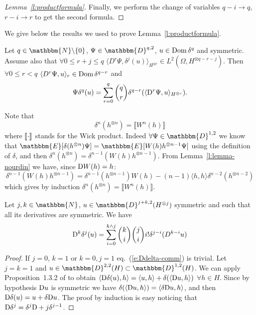 \begin{appendices}
\begin{proof}[Lemma~\ref{l:productformula}]
  Finally, we perform the change of variables $q - i \rightarrow q$, $r - i
  \rightarrow r$ to get the second formula.
\end{proof}

We give below the results we used to prove Lemma~\ref{l:productformula}.

\begin{lemma}
  \label{l:lemma-nourdin}Let $q \in \mathbbm{N}\backslash \{ 0 \}$, $\Psi \in
  \mathbbm{D}^{q, 2}$, $u \in \operatorname{Dom} \delta^q$ and symmetric. Assume also
  that $\forall 0 \leqslant r + j \leqslant q$ $\langle D^r \Psi, \delta^j (u)
  \rangle_{H^{\otimes r}} \in L^2 (\Omega, H^{\otimes q - r - j})$. Then
  $\forall 0 \leqslant r < q$ $\langle D^r \Psi, u \rangle_r \in \operatorname{Dom}
  \delta^{q - r}$ and
  \[ \Psi \delta^q (u) = \sum_{r = 0}^q \binom{q}{r} \delta^{q - r} (\langle
     \mathrm{D}^r \Psi, u \rangle_{H^{\otimes r}}) . \]
\end{lemma}

\begin{remark}
  \label{r:delta-tensor}Note that
  \[ \delta^n (h^{\otimes n}) = \llbracket W^n (h) \rrbracket \]
  where $\llbracket \cdot \rrbracket$ stands for the Wick product. Indeed
  $\forall \Psi \in \mathbbm{D}^{1, 2}$ we know that $\mathbbm{E} [\delta
  (h^{\otimes n}) \Psi] =\mathbbm{E} [W (h) h^{\otimes n - 1} \Psi]$ using the
  definition of $\delta$, and then $\delta^n (h^{\otimes n}) = \delta^{n - 1}
  (W (h) h^{\otimes n - 1})$. From Lemma~\ref{l:lemma-nourdin} we have, since
  $\mathrm{D} W (h) = h$:
  \[ \delta^{n - 1} (W (h) h^{\otimes n - 1}) = \delta^{n - 1} (h^{\otimes n -
     1}) W (h) - (n - 1) \langle h, h \rangle \delta^{n - 2} (h^{\otimes n -
     2}) \]
  which gives by induction $\delta^n (h^{\otimes n}) = \llbracket W^n (h)
  \rrbracket$.
\end{remark}

\begin{lemma}
  Let $j, k \in \mathbbm{N}$, $u \in \mathbbm{D}^{j + k, 2} (H^{\otimes j})$
  symmetric and such that all its derivatives are symmetric. We have
  \begin{equation}
    \mathrm{D}^k \delta^j (u) = \sum_{i = 0}^{k \wedge j} \binom{k}{i}
    \binom{j}{i} i! \delta^{j - i} (D^{k - i} u)  \label{e:Ddelta-comm}
  \end{equation}
\end{lemma}

\begin{proof}
  If $j = 0$, $k = 1$ or $k = 0, j = 1$ eq.~(\ref{e:Ddelta-comm}) is trivial.
  Let $j = k = 1$ and $u \in \mathbbm{D}^{2, 2} (H) \subset \mathbbm{D}^{1, 2}
  (H)$. We can apply Proposition~1.3.2 of {\cite{nualart_2006}} to obtain
  $\langle \mathrm{D} \delta (u), h \rangle = \langle u, h \rangle + \delta
  (\langle \mathrm{D} u, h \rangle)$ $\forall h \in H$. Since by hypothesis
  $\mathrm{D} u$ is symmetric we have $\delta (\langle \mathrm{D} u, h \rangle) =
  \langle \delta \mathrm{D} u, h \rangle$, and then $\mathrm{D} \delta (u) = u +
  \delta \mathrm{D} u$. The proof by induction is easy noticing that $\mathrm{D}
  \delta^j = \delta^j \mathrm{D} + j \delta^{j - 1}$.
\end{proof}


\end{appendices}
